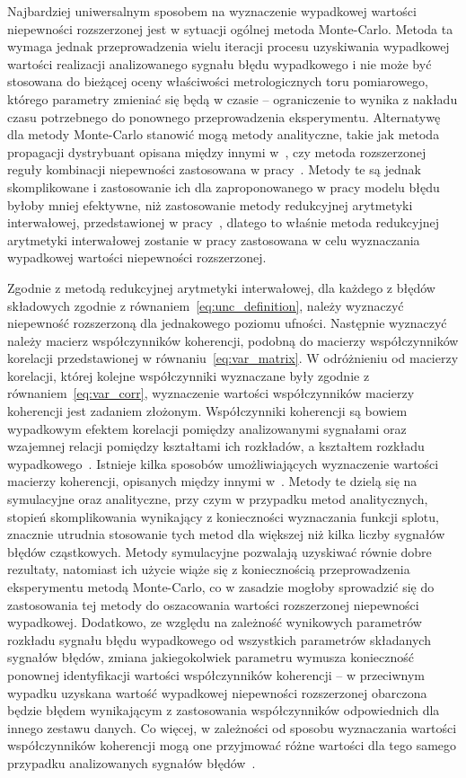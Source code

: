 Najbardziej uniwersalnym sposobem na wyznaczenie wypadkowej wartości niepewności rozszerzonej jest w sytuacji ogólnej metoda Monte-Carlo. Metoda ta wymaga jednak przeprowadzenia wielu iteracji procesu uzyskiwania wypadkowej wartości realizacji analizowanego sygnału błędu wypadkowego i nie może być stosowana do bieżącej oceny właściwości metrologicznych toru pomiarowego, którego parametry zmieniać się będą w czasie -- ograniczenie to wynika z nakładu czasu potrzebnego do ponownego przeprowadzenia eksperymentu. Alternatywę dla metody Monte-Carlo stanowić mogą metody analityczne, takie jak metoda propagacji dystrybuant opisana między innymi w~\cite{zhang_pdp}, czy metoda rozszerzonej reguły kombinacji niepewności zastosowana w pracy~\cite{yang_euc}. Metody te są jednak skomplikowane i zastosowanie ich dla zaproponowanego w pracy modelu błędu byłoby mniej efektywne, niż zastosowanie metody redukcyjnej arytmetyki interwałowej, przedstawionej w pracy~\cite{jakubiec_redmono}, dlatego to właśnie metoda redukcyjnej arytmetyki interwałowej zostanie w pracy zastosowana w celu wyznaczania wypadkowej wartości niepewności rozszerzonej.

Zgodnie z metodą redukcyjnej arytmetyki interwałowej, dla każdego z błędów składowych zgodnie z równaniem~\eqref{eq:unc_definition}, należy wyznaczyć niepewność rozszerzoną dla jednakowego poziomu ufności. Następnie wyznaczyć należy macierz współczynników koherencji, podobną do macierzy współczynników korelacji przedstawionej w równaniu~\eqref{eq:var_matrix}. W odróżnieniu od macierzy korelacji, której kolejne współczynniki wyznaczane były zgodnie z równaniem~\eqref{eq:var_corr}, wyznaczenie wartości współczynników macierzy koherencji jest zadaniem złożonym. Współczynniki koherencji są bowiem wypadkowym efektem korelacji pomiędzy analizowanymi sygnałami oraz wzajemnej relacji pomiędzy kształtami ich rozkładów, a kształtem rozkładu wypadkowego~\cite{jakubiec_system}. Istnieje kilka sposobów umożliwiających wyznaczenie wartości macierzy koherencji, opisanych między innymi w~\cite{jakubiec_redmono, jakubiec_reductive, jakubiec_system, batko_uncertainty}. Metody te dzielą się na symulacyjne oraz analityczne, przy czym w przypadku metod analitycznych, stopień skomplikowania wynikający z konieczności wyznaczania funkcji splotu, znacznie utrudnia stosowanie tych metod dla większej niż kilka liczby sygnałów błędów cząstkowych. Metody symulacyjne pozwalają uzyskiwać równie dobre rezultaty, natomiast ich użycie wiąże się z koniecznością przeprowadzenia eksperymentu metodą Monte-Carlo, co w zasadzie mogłoby sprowadzić się do zastosowania tej metody do oszacowania wartości rozszerzonej niepewności wypadkowej. Dodatkowo, ze względu na zależność wynikowych parametrów rozkładu sygnału błędu wypadkowego od wszystkich parametrów składanych sygnałów błędów, zmiana jakiegokolwiek parametru wymusza konieczność ponownej identyfikacji wartości współczynników koherencji -- w przeciwnym wypadku uzyskana wartość wypadkowej niepewności rozszerzonej obarczona będzie błędem wynikającym z zastosowania współczynników odpowiednich dla innego zestawu danych. Co więcej, w zależności od sposobu wyznaczania wartości współczynników koherencji mogą one przyjmować różne wartości dla tego samego przypadku analizowanych sygnałów błędów~\cite{jakubiec_redmono}.

